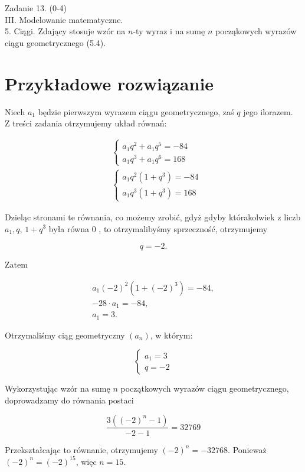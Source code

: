 \documentclass[10pt]{article}
\begin{document}
Zadanie 13. (0-4)\\
III. Modelowanie matematyczne.\\
5. Ciągi. Zdający stosuje wzór na $n$-ty wyraz i na sumę $n$ począkowych wyrazów ciągu geometrycznego (5.4).

\section*{Przykładowe rozwiązanie}
Niech $a_{1}$ będzie pierwszym wyrazem ciągu geometrycznego, zaś $q$ jego ilorazem.\\
Z treści zadania otrzymujemy układ równań:

$$
\begin{aligned}
& \left\{\begin{array}{l}
a_{1} q^{2}+a_{1} q^{5}=-84 \\
a_{1} q^{3}+a_{1} q^{6}=168
\end{array}\right. \\
& \left\{\begin{array}{l}
a_{1} q^{2}\left(1+q^{3}\right)=-84 \\
a_{1} q^{3}\left(1+q^{3}\right)=168
\end{array}\right.
\end{aligned}
$$

Dzieląc stronami te równania, co możemy zrobić, gdyż gdyby którakolwiek z liczb $a_{1}, q$, $1+q^{3}$ była równa 0 , to otrzymalibyśmy sprzeczność, otrzymujemy

$$
q=-2 .
$$

Zatem

$$
\begin{gathered}
a_{1}(-2)^{2}\left(1+(-2)^{3}\right)=-84, \\
-28 \cdot a_{1}=-84, \\
a_{1}=3 .
\end{gathered}
$$

Otrzymaliśmy ciąg geometryczny $\left(a_{n}\right)$, w którym:

$$
\left\{\begin{array}{l}
a_{1}=3 \\
q=-2
\end{array}\right.
$$

Wykorzystując wzór na sumę $n$ początkowych wyrazów ciągu geometrycznego, doprowadzamy do równania postaci

$$
\frac{3\left((-2)^{n}-1\right)}{-2-1}=32769
$$

Przekształcając to równanie, otrzymujemy $(-2)^{n}=-32768$. Ponieważ $(-2)^{n}=(-2)^{15}$, więc $n=15$.
\end{document}
